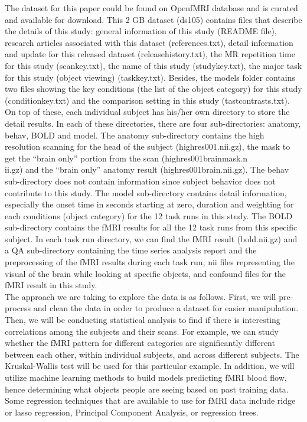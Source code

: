 \documentclass[11pt]{article}
\begin{document}
The dataset for this paper could be found on OpenfMRI database and is curated 
and available for download. This 2 GB dataset (ds105) contains files that 
describe the details of this study: general information of this study 
(README file), research articles associated with this dataset (references.txt), 
detail information and update for this released dataset 
(release\textunderscore history.txt), the MR repetition time for this study 
(scan\textunderscore key.txt), the name of this study 
(study\textunderscore key.txt), the major task for this study (object viewing) 
(task\textunderscore key.txt). Besides, the models folder contains two files 
showing the key conditions (the list of the object category) for this study 
(condition\textunderscore key.txt) and the comparison setting in this study 
(tast\textunderscore contrasts.txt). On top of these, each individual subject 
has his/her own directory to store the detail results. In each of these 
directories, there are four sub-directories: anatomy, behav, BOLD and model. 
The anatomy sub-directory contains the high resolution scanning for the head of 
the subject (highres001.nii.gz), the mask to get the ``brain only'' portion 
from the scan (highres001\textunderscore brain\textunderscore mask.n\\ii.gz) 
and the ``brain only'' anatomy result (highres001\textunderscore brain.nii.gz). 
The behav sub-directory does not contain information since subject behavior 
does not contribute to this study. The model sub-directory contains detail 
information, especially the onset time in seconds starting at zero, duration 
and weighting for each conditions (object category) for the 12 task runs in 
this study. The BOLD sub-directory contains the fMRI results for all the 12 
task runs from this specific subject. In each task run directory, we can find 
the fMRI result (bold.nii.gz) and a QA sub-directory containing the time series 
analysis report and the preprocessing of the fMRI results during each task run, 
nii files representing the visual of the brain while looking at specific 
objects, and confound files for the fMRI result in this study.\\ 

The approach we are taking to explore the data is as follows. First, we will
pre-process and clean the data in order to produce a dataset for easier
manipulation. Then, we will be conducting statistical analysis to find if there
is interesting correlations among the subjects and their scans. For example,
we can study whether the fMRI pattern for different categories are
significantly different between each other, within individual subjects, and
across different subjects. The Kruskal-Wallis test will be used for this
particular example. In addition, we will utilize machine learning methods to
build models predicting fMRI blood flow, hence determining what objects people
are seeing based on past training data. Some regression techniques that are
available to use for fMRI data include ridge or lasso regression, Principal
Component Analysis, or regression trees.\\


\end{document}
